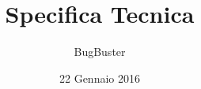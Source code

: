 



\title{\textbf{Specifica Tecnica}}
\author{BugBuster}

\date{22 Gennaio 2016}




\makeFrontPage

\tableofcontents





